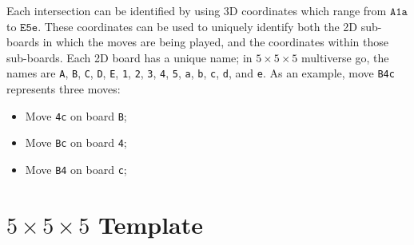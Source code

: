 \documentclass{article}
\begin{document}
Each intersection can be identified by using 3D coordinates which range from
$\texttt{A1a}$ to $\texttt{E5e}$.  These coordinates can be used to uniquely
identify both the 2D sub-boards in which the moves are being played, and the
coordinates within those sub-boards.
%
Each 2D board has a unique name;  in $5\times 5\times 5$ multiverse go, the
names are 
%
\texttt{A}, \texttt{B}, \texttt{C}, \texttt{D}, \texttt{E},
%
\texttt{1}, \texttt{2}, \texttt{3}, \texttt{4}, \texttt{5},
%
\texttt{a}, \texttt{b}, \texttt{c}, \texttt{d}, and \texttt{e}.
%
As an example, move \texttt{B4c} represents three moves:
%
\begin{itemize}
  \item Move \texttt{4c} on board \texttt{B};
  \item Move \texttt{Bc} on board \texttt{4};
  \item Move \texttt{B4} on board \texttt{c};
\end{itemize}

\section*{$5\times 5\times 5$ Template}
\end{document}
